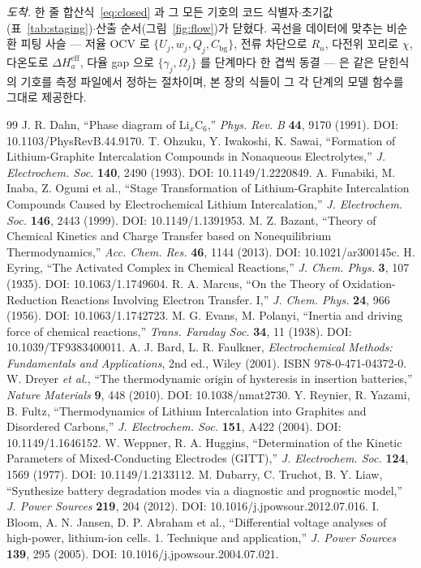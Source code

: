 \documentclass[11pt,a4paper]{article}
\newcommand{\eff}{\mathrm{eff}}
\newcommand{\bg}{\mathrm{bg}}
\begin{document}
\medskip
\emph{도착.} 한 줄 합산식~\eqref{eq:closed} 과 그 모든 기호의 코드 식별자$\cdot$초기값(표~\ref{tab:staging})$\cdot$산출 순서(그림~\ref{fig:flow})가 닫혔다. 곡선을 데이터에 맞추는 비순환 피팅 사슬 — 저율 OCV 로 $\{U_j,w_j,Q_j,C_\bg\}$, 전류 차단으로 $R_n$, 다전위 꼬리로 $\chi$, 다온도로 $\Delta H_a^\eff$, 다율 gap 으로 $\{\gamma_j,\Omega_j\}$ 를 단계마다 한 겹씩 동결 — 은 같은 닫힌식의 기호를 측정 파일에서 정하는 절차이며, 본 장의 식들이 그 각 단계의 모델 함수를 그대로 제공한다.

\begin{thebibliography}{99}
 J. R. Dahn, ``Phase diagram of Li$_x$C$_6$,'' \emph{Phys. Rev. B} \textbf{44}, 9170 (1991). DOI: 10.1103/PhysRevB.44.9170.
 T. Ohzuku, Y. Iwakoshi, K. Sawai, ``Formation of Lithium-Graphite Intercalation Compounds in Nonaqueous Electrolytes,'' \emph{J. Electrochem. Soc.} \textbf{140}, 2490 (1993). DOI: 10.1149/1.2220849.
 A. Funabiki, M. Inaba, Z. Ogumi et al., ``Stage Transformation of Lithium-Graphite Intercalation Compounds Caused by Electrochemical Lithium Intercalation,'' \emph{J. Electrochem. Soc.} \textbf{146}, 2443 (1999). DOI: 10.1149/1.1391953.
 M. Z. Bazant, ``Theory of Chemical Kinetics and Charge Transfer based on Nonequilibrium Thermodynamics,'' \emph{Acc. Chem. Res.} \textbf{46}, 1144 (2013). DOI: 10.1021/ar300145c.
 H. Eyring, ``The Activated Complex in Chemical Reactions,'' \emph{J. Chem. Phys.} \textbf{3}, 107 (1935). DOI: 10.1063/1.1749604.
 R. A. Marcus, ``On the Theory of Oxidation-Reduction Reactions Involving Electron Transfer. I,'' \emph{J. Chem. Phys.} \textbf{24}, 966 (1956). DOI: 10.1063/1.1742723.
 M. G. Evans, M. Polanyi, ``Inertia and driving force of chemical reactions,'' \emph{Trans. Faraday Soc.} \textbf{34}, 11 (1938). DOI: 10.1039/TF9383400011.
 A. J. Bard, L. R. Faulkner, \emph{Electrochemical Methods: Fundamentals and Applications}, 2nd ed., Wiley (2001). ISBN 978-0-471-04372-0.
 W. Dreyer \emph{et al.}, ``The thermodynamic origin of hysteresis in insertion batteries,'' \emph{Nature Materials} \textbf{9}, 448 (2010). DOI: 10.1038/nmat2730.
 Y. Reynier, R. Yazami, B. Fultz, ``Thermodynamics of Lithium Intercalation into Graphites and Disordered Carbons,'' \emph{J. Electrochem. Soc.} \textbf{151}, A422 (2004). DOI: 10.1149/1.1646152.
 W. Weppner, R. A. Huggins, ``Determination of the Kinetic Parameters of Mixed-Conducting Electrodes (GITT),'' \emph{J. Electrochem. Soc.} \textbf{124}, 1569 (1977). DOI: 10.1149/1.2133112.
 M. Dubarry, C. Truchot, B. Y. Liaw, ``Synthesize battery degradation modes via a diagnostic and prognostic model,'' \emph{J. Power Sources} \textbf{219}, 204 (2012). DOI: 10.1016/j.jpowsour.2012.07.016.
 I. Bloom, A. N. Jansen, D. P. Abraham et al., ``Differential voltage analyses of high-power, lithium-ion cells. 1. Technique and application,'' \emph{J. Power Sources} \textbf{139}, 295 (2005). DOI: 10.1016/j.jpowsour.2004.07.021.
\end{thebibliography}
\end{document}
